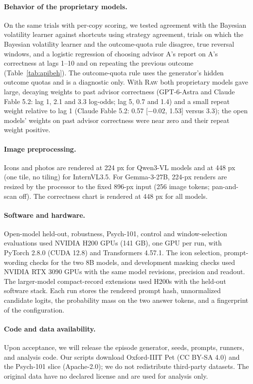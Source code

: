 \documentclass[letterpaper]{article} %
\newcommand{\Raw}{\textsc{Raw}}
\begin{document}
\paragraph{Behavior of the proprietary models.} On the same trials with per-copy scoring, we tested agreement with the Bayesian volatility learner against shortcuts using strategy agreement, trials on which the Bayesian volatility learner and the outcome-quota rule disagree, true reversal windows, and a logistic regression of choosing advisor A's report on A's correctness at lags 1--10 and on repeating the previous outcome (Table~\ref{tab:apibeh}). The outcome-quota rule uses the generator's hidden outcome quotas and is a diagnostic only. With \Raw{} both proprietary models gave large, decaying weights to past advisor correctness (GPT-6-Astra and Claude Fable 5.2: lag 1, 2.1 and 3.3 log-odds; lag 5, 0.7 and 1.4) and a small repeat weight relative to lag 1 (Claude Fable 5.2: 0.57 [$-0.02$, 1.53] versus 3.3); the open models' weights on past advisor correctness were near zero and their repeat weight positive.

\paragraph{Image preprocessing.} Icons and photos are rendered at 224 px for Qwen3-VL models and at 448 px (one tile, no tiling) for InternVL3.5. For Gemma-3-27B, 224-px renders are resized by the processor to the fixed 896-px input (256 image tokens; pan-and-scan off). The correctness chart is rendered at 448 px for all models.

\paragraph{Software and hardware.} Open-model held-out, robustness, Psych-101, control and window-selection evaluations used NVIDIA H200 GPUs (141 GB), one GPU per run, with PyTorch 2.8.0 (CUDA 12.8) and Transformers 4.57.1. The icon selection, prompt-wording checks for the two 8B models, and development masking checks used NVIDIA RTX 3090 GPUs with the same model revisions, precision and readout. The larger-model compact-record extensions used H200s with the held-out software stack. Each run stores the rendered prompt hash, unnormalized candidate logits, the probability mass on the two answer tokens, and a fingerprint of the configuration.

\paragraph{Code and data availability.} Upon acceptance, we will release the episode generator, seeds, prompts, runners, and analysis code. Our scripts download Oxford-IIIT Pet (CC BY-SA 4.0) and the Psych-101 slice (Apache-2.0); we do not redistribute third-party datasets. The original \citet{xiong2023neural} data have no declared license and are used for analysis only.
\end{document}
